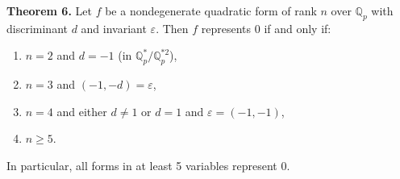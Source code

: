 \textbf{Theorem 6.} Let $f$ be a nondegenerate quadratic form of rank $n$ over $\mathbb{Q}_p$ with discriminant $d$ and invariant $\varepsilon$. Then $f$ represents $0$ if and only if:
\begin{enumerate}
\item[(i)] $n = 2$ and $d = -1$ (in $\mathbb{Q}_p^*/\mathbb{Q}_p^{*2}$),
\item[(ii)] $n = 3$ and $(-1, -d) = \varepsilon$,
\item[(iii)] $n = 4$ and either $d \neq 1$ or $d = 1$ and $\varepsilon = (-1, -1)$,
\item[(iv)] $n \geq 5$.
\end{enumerate}
In particular, all forms in at least 5 variables represent 0.

